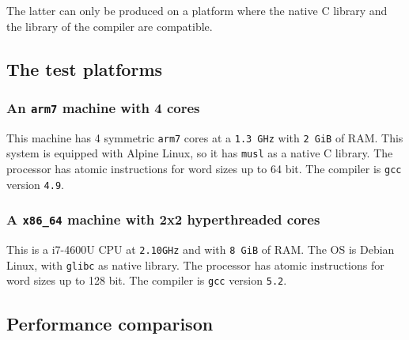 The latter can only be produced on a platform where the native C
library and the library of the compiler are compatible.

\subsection{The test platforms}
\label{sec-4-3}

\subsubsection{An \texttt{arm7} machine with 4 cores}
\label{sec-4-3-1}

This machine has 4 symmetric \texttt{arm7} cores at a \texttt{1.3 GHz} with \texttt{2
    GiB} of RAM. This system is equipped with Alpine Linux, so it has
\texttt{musl} as a native C library. The processor has atomic
instructions for word sizes up to 64 bit. The compiler is \texttt{gcc}
version \texttt{4.9}.

\subsubsection{A \texttt{x86\_64} machine with 2x2 hyperthreaded cores}
\label{sec-4-3-2}

This is a i7-4600U CPU at \texttt{2.10GHz} and with \texttt{8 GiB} of RAM. The
OS is Debian Linux, with \texttt{glibc} as native library.  The processor
has atomic instructions for word sizes up to 128 bit. The compiler
is \texttt{gcc} version \texttt{5.2}.

\subsection{Performance comparison}
\label{sec-4-4}

